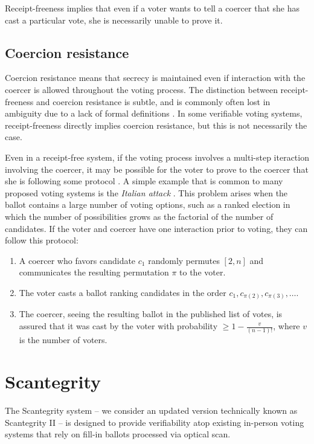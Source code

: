 \documentclass[10pt,twocolumn]{article}
\newcommand{\term}[1]{\textit{#1}}
\begin{document}
Receipt-freeness implies that even if a voter wants to tell a coercer that
she has cast a particular vote, she is necessarily unable to prove it.

\subsection{Coercion resistance}

Coercion resistance means that secrecy is maintained even if interaction
with the coercer is allowed throughout the voting process.
The distinction between receipt-freeness and coercion resistance is subtle,
and is commonly often lost in ambiguity due to a lack of formal definitions \cite{delaune}.
In some verifiable voting systems, receipt-freeness directly implies coercion resistance,
but this is not necessarily the case.

Even in a receipt-free system,
if the voting process involves a multi-step iteraction involving the coercer,
it may be possible for the voter to prove to the coercer that she is following
some protocol \cite{delaune}.
A simple example that is common to many proposed voting systems is
the \term{Italian attack} \cite{preta}.
This problem arises when the ballot contains a large number of voting options,
such as a ranked election in which the number of possibilities grows as the
factorial of the number of candidates.
If the voter and coercer have one interaction prior to voting,
they can follow this protocol:
\begin{enumerate}
\item A coercer who favors candidate $c_1$ randomly permutes $[2, n]$ and
communicates the resulting permutation $\pi$ to the voter.
\item The voter casts a ballot ranking candidates in the order
$c_1, c_{\pi(2)}, c_{\pi(3)}, \ldots$.
\item The coercer, seeing the resulting ballot in the published list of votes,
is assured that it was cast by the voter with probability
$\ge 1 - \frac{v}{(n-1)!}$, where $v$ is the number of voters.
\end{enumerate}

\section{Scantegrity}

The Scantegrity system \cite{scantegrity_ii} -- we consider an updated version technically known as
Scantegrity II -- is designed to provide verifiability atop existing in-person voting systems that
rely on fill-in ballots processed via optical scan.
\end{document}
